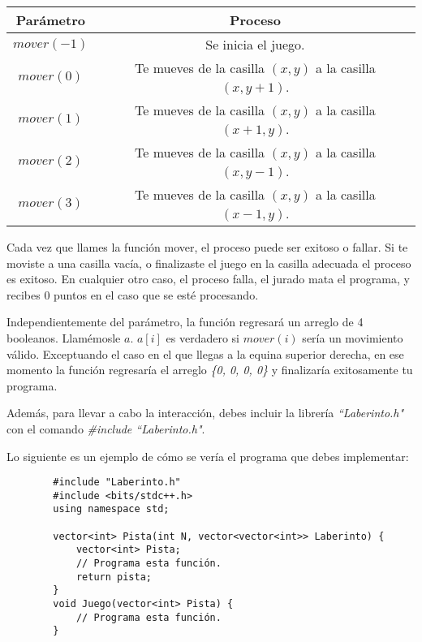 \documentclass[12pt]{scrartcl}
\begin{document}
    \begin{center}
        \begin{tabular}{|c|c|}
            \hline
            {\bfseries Parámetro} & {\bfseries Proceso}\\
            \hline
             $mover(-1)$ & Se inicia el juego. \\
             \hline
             $mover(0)$ &  Te mueves de la casilla $(x, y)$ a la casilla $(x, y + 1)$. \\
             \hline
             $mover(1)$ & Te mueves de la casilla $(x, y)$ a la casilla $(x + 1, y)$.\\
             \hline
             $mover(2)$ & Te mueves de la casilla $(x, y)$ a la casilla $(x, y - 1)$.\\
             \hline
             $mover(3)$ & Te mueves de la casilla $(x, y)$ a la casilla $(x - 1, y)$.\\
             \hline
        \end{tabular}
    \end{center}

    Cada vez que llames la función mover, el proceso puede ser exitoso o fallar.  Si te moviste a una casilla vacía, o finalizaste el juego en la casilla adecuada el proceso es exitoso. En cualquier otro caso, el proceso falla, el jurado mata el programa, y recibes 0 puntos en el caso que se esté procesando.
    
    
    Independientemente del parámetro, la función regresará  un arreglo de 4 booleanos. Llamémosle $a$. $a[i]$ es verdadero si $mover(i)$ sería un movimiento válido. Exceptuando el caso en el que llegas a la equina superior derecha, en ese momento la función regresaría el arreglo \textit{\{0, 0, 0, 0\}} y finalizaría exitosamente tu programa.

    Además, para llevar a cabo la interacción, debes incluir la librería \textit{``Laberinto.h"} con el comando \textit{\#include ``Laberinto.h"}.
    
    Lo siguiente es un ejemplo de cómo se vería el programa que debes implementar:
    
    \begin{verbatim}
        #include "Laberinto.h"
        #include <bits/stdc++.h>
        using namespace std;
        
        vector<int> Pista(int N, vector<vector<int>> Laberinto) {
            vector<int> Pista;
            // Programa esta función.
            return pista;
        }
        void Juego(vector<int> Pista) {
            // Programa esta función.
        }
        
    \end{verbatim}
\end{document}
